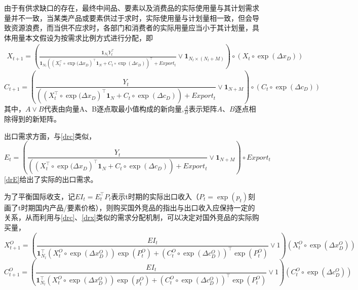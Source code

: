 \documentclass{article}
\begin{document}
由于有供求缺口的存在，最终中间品、要素以及消费品的实际使用量与其计划需求量并不一致，当某类产品或要素供过于求时，实际使用量与计划量相一致，但会导致资源浪费，而当供不应求时，各部门和消费者的实际用量应当小于其计划量，具体用量本文假设为按需求比例方式进行分配，即
\begin{equation}\label{drx}
    \begin{aligned}
        X_{t+1}=\left(\frac{\mathbf{1}_{N_l}Y_t^\top}{\mathbf{1}_{N_l}\left(\left(X_t^\top\circ\exp(\Delta x_D\right)^\top\mathbf{1}_N+C_t\circ\exp(\Delta c_D)\right)^\top+Export_t}\lor \mathbf{1}_{N_l\times(N_l+M)}\right)\circ\left(X_t\circ\exp(\Delta x_D)\right)
    \end{aligned}
\end{equation} 
\begin{equation}\label{drc}
     C_{t+1}=\left(\frac{Y_t}{\left(\left(X_t^\top\circ\exp(\Delta x_D\right)^\top\mathbf{1}_N+C_t\circ\exp(\Delta c_D)\right)+Export_t}\lor \mathbf{1}_{N+M}\right)\circ\left(C_t\circ\exp(\Delta c_D)\right)
\end{equation} 其中，$A\lor B$代表由向量A、B逐点取最小值构成的新向量,$\frac{A}{B}$表示矩阵$A$、$B$逐点相除得到的新矩阵。

出口需求方面，与\eqref{drc}类似，
\begin{equation}\label{drE}
     E_{t}=\left(\frac{Y_t}{\left(\left(X_t^\top\circ\exp(\Delta x_D\right)^\top\mathbf{1}_N+C_t\circ\exp(\Delta c_D)\right)+Export_t}\lor \mathbf{1}_{N+M}\right)\circ Export_t
\end{equation} \eqref{drE}给出了实际的出口需求。

为了平衡国际收支，记$EI_t=E_t^\top P_t$表示t时期的实际出口收入（$P_t=\exp(p_t)$刻画了t时期国内产品/要素价格），则购买国外竞品的指出与出口收入应保持一定的关系，从而利用与\eqref{drc}、\eqref{drx}类似的需求分配机制，可以决定对国外竞品的实际购买量，
\begin{equation}\label{drxo}
    X^O_{t+1}=\left(\frac{EI_t}{\mathbf{1}_{N_l}^\top \left(X^O_t\circ\exp(\Delta x_D^O)\right) \exp(P^O_{t})+\left(C^O_t\circ\exp(\Delta c_D^O)\right)^\top \exp(P^O_{t})}\lor 1\right)\left(X^O_t\circ\exp(\Delta x_D^O)\right) 
\end{equation}
\begin{equation}\label{drco}
    C^O_{t+1}=\left(\frac{EI_t}{\mathbf{1}_{N_l}^\top \left(X^O_t\circ\exp(\Delta x_D^O)\right) \exp(p^O_{t})+\left(C^O_t\circ\exp(\Delta c_D^O)\right)^\top\exp( P^O_{t})}\lor 1\right)\left(C_t^O\circ\exp(\Delta c_D^O)\right)
\end{equation} 
\end{document}
